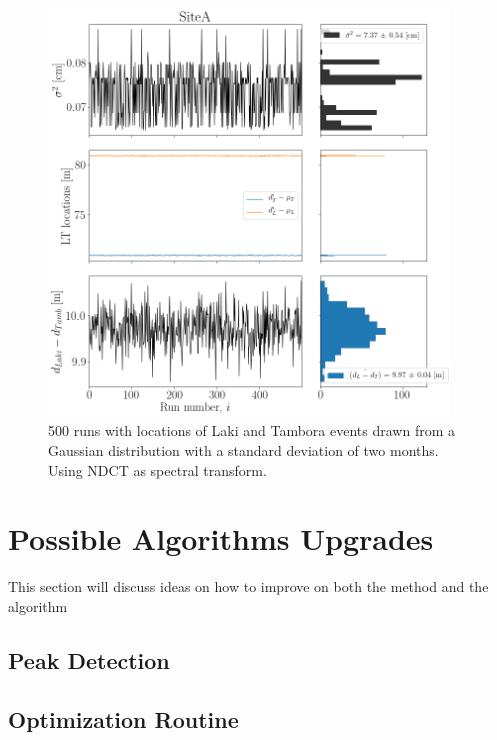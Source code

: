 \documentclass[../../CompleteThesis2/Complete_2ndDraft]{subfiles}
\begin{document}
\begin{figure}[h]
	\centering
	\includegraphics[width=0.95\textwidth]{SiteA_Vary_LandT_2mnth_NDCT.png}
	\caption[2 Month Variation of Event Locations, Site A]{\small 500 runs with locations of Laki and Tambora events drawn from a Gaussian distribution with a standard deviation of two months. Using NDCT as spectral transform.}
	\label{fig:SiteA_LandT_Gauss_2mnth_NDCT}
\end{figure}



\section[Upgrades][Upgrades]{Possible Algorithms Upgrades}
\label{Sec:Method_Upgrades}

This section will discuss ideas on how to improve on both the method and the algorithm

\subsection[Peak Detection]{Peak Detection}
\label{Subsec:Method_Upgrades_PeakDet}

\subsection[Optimization Routine]{Optimization Routine}
\label{Subsec:Method_Upgrades_OptiRout}
\end{document}
